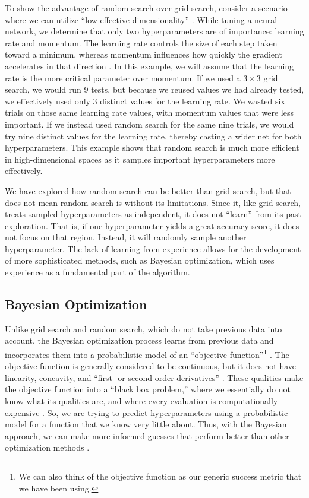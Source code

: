 \documentclass[stu,12pt,floatsintext]{apa7}
\begin{document}
To show the advantage of random search over grid search, consider a scenario where we can utilize ``low effective dimensionality'' \parencite{bergstra2012random}. While tuning a neural network, we determine that only two hyperparameters are of importance: learning rate and momentum. The learning rate controls the size of each step taken toward a minimum, whereas momentum influences how quickly the gradient accelerates in that direction \parencite{orr_1999_momentum}. In this example, we will assume that the learning rate is the more critical parameter over momentum. If we used a \(3 \times 3\) grid search, we would run 9 tests, but because we reused values we had already tested, we effectively used only 3 distinct values for the learning rate. We wasted six trials on those same learning rate values, with momentum values that were less important. If we instead used random search for the same nine trials, we would try nine distinct values for the learning rate, thereby casting a wider net for both hyperparameters. This example shows that random search is much more efficient in high-dimensional spaces as it samples important hyperparameters more effectively.

We have explored how random search can be better than grid search, but that does not mean random search is without its limitations. Since it, like grid search, treats sampled hyperparameters as independent, it does not ``learn'' from its past exploration. That is, if one hyperparameter yields a great accuracy score, it does not focus on that region. Instead, it will randomly sample another hyperparameter. The lack of learning from experience allows for the development of more sophisticated methods, such as Bayesian optimization, which uses experience as a fundamental part of the algorithm.  

\subsection{Bayesian Optimization}

Unlike grid search and random search, which do not take previous data into account, the Bayesian optimization process learns from previous data and incorporates them into a probabilistic model of an ``objective function''\footnote{We can also think of the objective function as our generic success metric that we have been using.} \parencite{frazier2018tutorial}. The objective function is generally considered to be continuous, but it does not have linearity, concavity, and ``first- or second-order derivatives'' \parencite{frazier2018tutorial}. These qualities make the objective function into a ``black box problem,'' where we essentially do not know what its qualities are, and where every evaluation is computationally expensive \parencite{WU201926}. So, we are trying to predict hyperparameters using a probabilistic model for a function that we know very little about. Thus, with the Bayesian approach, we can make more informed guesses that perform better than other optimization methods \parencite{WU201926}.
\end{document}
